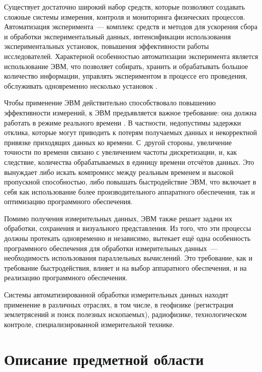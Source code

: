 \documentclass[a4paper, 14pt, titlepage]{extarticle}
\let\oldsection\section
\renewcommand{\section}{\newpage\oldsection}
\begin{document}
  Существует достаточно широкий набор средств, которые позволяют создавать сложные системы
  измерения, контроля и мониторинга физических процессов. Автоматизация эксперимента~--- комплекс
  средств и методов для ускорения сбора и обработки экспериментальный данных, интенсификации
  использования экспериментальных установок, повышения эффективности работы исследователей.
  Характерной особенностью автоматизации эксперимента является использование ЭВМ, что позволяет
  собирать, хранить и обрабатывать большое количество информации, управлять экспериментом в процессе
  его проведения, обслуживать одновременно несколько установок \cite{sokolov-auto-measure}.

  Чтобы применение ЭВМ действительно способствовало повышению эффективности измерений, к ЭВМ
  предъявляется важное требование: она должна работать в режиме реального времени
  \cite{tessier-reconfigurable}. В частности, недопустимы задержки отклика, которые могут приводить
  к потерям получаемых данных и некорректной привязке приходящих данных ко времени. С~другой
  стороны, увеличение точности по времени связано с увеличением частоты дискретизации, и, как
  следствие, количества обрабатываемых в единицу времени отсчётов данных. Это вынуждает либо искать
  компромисс между реальным временем и высокой пропускной способностью, либо повышать быстродействие
  ЭВМ, что включает в себя как использование более производительного аппаратного обеспечения, так и
  оптимизацию программного обеспечения.

  Помимо получения измерительных данных, ЭВМ также решает задачи их обработки, сохранения и
  визуального представления. Из того, что эти процессы должны протекать одновременно и независимо,
  вытекает ещё одна особенность программного обеспечения для обработки измерительных данных~---
  необходимость использования параллельных вычислений. Это требование, как и требование
  быстродействия, влияет и на выбор аппаратного обеспечения, и на реализацию программного обеспечения.

  Системы автоматизированной обработки измерительных данных находят применение в различных отраслях,
  в том числе, в геофизике (регистрация землетрясений и поиск полезных ископаемых), радиофизике,
  технологическом контроле, специализированной измерительной технике. %

  \section{Описание предметной области}
\end{document}
